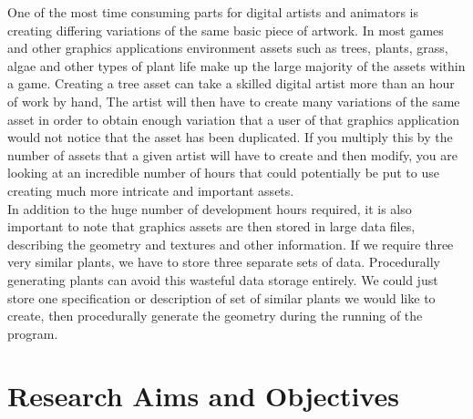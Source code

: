 \begin{flushleft}
One of the most time consuming parts for digital artists and animators is creating differing variations of the same basic piece of artwork. In most games and other graphics applications environment assets such as trees, plants, grass, algae and other types of plant life make up the large majority of the assets within a game. Creating a tree asset can take a skilled digital artist more than an hour of work by hand, The artist will then have to create many variations of the same asset in order to obtain enough variation that a user of that graphics application would not notice that the asset has been duplicated. If you multiply this by the number of assets that a given artist will have to create and then modify, you are looking at an incredible number of hours that could potentially be put to use creating much more intricate and important assets.\\
\vspace{5mm}
In addition to the huge number of development hours required, it is also important to note that graphics assets are then stored in large data files, describing the geometry and textures and other information. If we require three very similar plants, we have to store three separate sets of data. Procedurally generating plants can avoid this wasteful data storage entirely. We could just store one specification or description of set of similar plants we would like to create, then procedurally generate the geometry during the running of the program.\\
\end{flushleft}

\section{Research Aims and Objectives}

